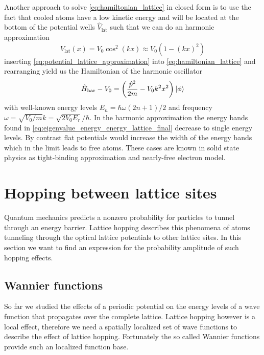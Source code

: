 Another approach to solve \cref{eq:hamiltonian_lattice} in closed form is to
use the fact that cooled atoms have a low kinetic energy and will be located
at the bottom of the potential wells $\hat{V}_\text{lat}$ such that we can
do an harmonic approximation
\begin{equation}
  V_\text{lat}(x)
  =V_0\cos^2(kx)
  \approx V_0\left(1-(kx)^2\right)
  \label{eq:potential_lattice_approximation}
\end{equation}
inserting \cref{eq:potential_lattice_approximation} into
\cref{eq:hamiltonian_lattice} and rearranging yield us the Hamiltonian of
the harmonic oscillator
\begin{equation}
  \hat{H}_\text{har}-V_0
  =\left(\frac{\hat{p}^2}{2m}-V_0k^2x^2\right)\ket{\phi}
  \label{eq:hamiltonian_harmonic}
\end{equation}
with well-known energy levels $E_n=\hbar\omega(2n+1)/2$ and frequency
$\omega=\sqrt{V_0/m}k=\sqrt{2V_0E_r}/\hbar$. In the harmonic approximation
the energy bands found in \cref{eq:eigenvalue_energy_energy_lattice_final}
decrease to single energy levels. By contrast flat potentials would increase
the width of the energy bands which in the limit leads to free atoms. These
cases are known in solid state physics as tight-binding approximation and
nearly-free electron model.

\section{Hopping between lattice sites}

Quantum mechanics predicts a nonzero probability for particles to tunnel
through an energy barrier. Lattice hopping describes this phenomena of atoms
tunneling through the optical lattice potentials to other lattice sites. In
this section we want to find an expression for the probability amplitude of
such hopping effects.

\subsection{Wannier functions}

So far we studied the effects of a periodic potential on the energy levels of
a wave function that propagates over the complete lattice. Lattice hopping
however is a local effect, therefore we need a spatially localized set of
wave functions to describe the effect of lattice hopping. Fortunately the
so called Wannier functions provide such an localized function base.

